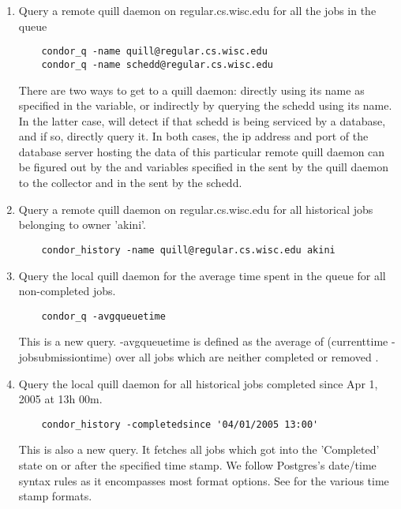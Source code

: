 \begin{enumerate}
\item Query a remote quill daemon on regular.cs.wisc.edu for all the jobs in 
the queue
\begin{verbatim}
	condor_q -name quill@regular.cs.wisc.edu
	condor_q -name schedd@regular.cs.wisc.edu

\end{verbatim}
There are two ways to get to a quill daemon: directly using its name as 
specified in the  variable, or indirectly
by querying the schedd using its name.  In the latter case,  will detect 
if that schedd is being serviced by a database, and if so, directly query it.
In both cases, the ip address and port of the database server hosting the data of 
this particular remote quill daemon can be figured out by the  
and  variables specified in the 
sent by the quill daemon to the collector and in the  sent by
the schedd.  

\item Query a remote quill daemon on regular.cs.wisc.edu for all historical 
jobs belonging to owner 'akini'.
\begin{verbatim}
	condor_history -name quill@regular.cs.wisc.edu akini
\end{verbatim}

\item Query the local quill daemon for the average time spent in the queue 
for all non-completed jobs. 
\begin{verbatim}
	condor_q -avgqueuetime 
\end{verbatim}
This is a new query.  -avgqueuetime is defined as the average of
(currenttime - jobsubmissiontime) over all jobs which are neither
completed  or removed .

\item Query the local quill daemon for all historical jobs completed since 
Apr 1, 2005 at 13h 00m.
\begin{verbatim}
	condor_history -completedsince '04/01/2005 13:00'
\end{verbatim}
This is also a new query.  It fetches all jobs
which got into the 'Completed' state on or after the
specified time stamp.  We follow Postgres's date/time
syntax rules as it encompasses most format options.  See
for the various time stamp formats.

\end{enumerate}

